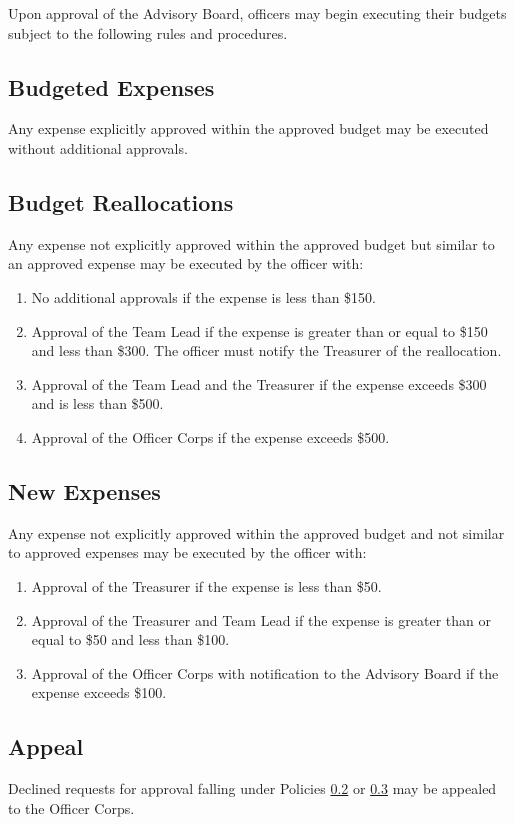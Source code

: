 Upon approval of the Advisory Board, officers may begin executing their budgets subject to the following rules and procedures.

\subsection{Budgeted Expenses} \label{III.1}
Any expense explicitly approved within the approved budget may be executed without additional approvals.

\subsection{Budget Reallocations} \label{III.2}
Any expense not explicitly approved within the approved budget but similar to an approved expense may be executed by the officer with:
\begin{enumerate}
    \item No additional approvals if the expense is less than \$150.
    \item Approval of the Team Lead if the expense is greater than or equal to \$150 and less than \$300. The officer must notify the Treasurer of the reallocation.
    \item Approval of the Team Lead and the Treasurer if the expense exceeds \$300 and is less than \$500.
    \item Approval of the Officer Corps if the expense exceeds \$500.
\end{enumerate}

\subsection{New Expenses} \label{III.3}
Any expense not explicitly approved within the approved budget and not similar to approved expenses may be executed by the officer with:
\begin{enumerate}
    \item Approval of the Treasurer if the expense is less than \$50.
    \item Approval of the Treasurer and Team Lead if the expense is greater than or equal to \$50 and less than \$100.
    \item Approval of the Officer Corps with notification to the Advisory Board if the expense exceeds \$100.
\end{enumerate}

\subsection{Appeal} \label{III.4}
Declined requests for approval falling under Policies \ref{III.2} or \ref{III.3} may be appealed to the Officer Corps.

